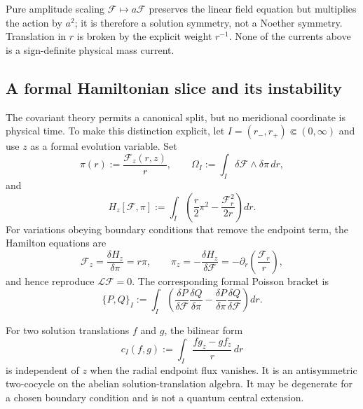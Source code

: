 Pure amplitude scaling $\mathcal F\mapsto a\mathcal F$ preserves the linear
field equation but multiplies the action by $a^2$; it is therefore a solution
symmetry, not a Noether symmetry. Translation in $r$ is broken by the
explicit weight $r^{-1}$. None of the currents above is a sign-definite
physical mass current.

\subsection{A formal Hamiltonian slice and its instability}

The covariant theory permits a canonical split, but no meridional coordinate
is physical time. To make this distinction explicit, let
$I=(r_-,r_+)\Subset(0,\infty)$ and use $z$ as a formal evolution variable.
Set
\begin{equation}
\pi(r):=\frac{\mathcal F_z(r,z)}{r},
\qquad
\Omega_I:=\int_I\delta\mathcal F\wedge\delta\pi\,dr,
\label{eq:ms-slice-symplectic-form}
\end{equation}
and
\begin{equation}
H_z[\mathcal F,\pi]
:=\int_I\left(\frac r2\pi^2-\frac{\mathcal F_r^2}{2r}\right)dr.
\label{eq:ms-z-Hamiltonian}
\end{equation}
For variations obeying boundary conditions that remove the endpoint term,
the Hamilton equations are
\begin{equation}
\mathcal F_z=\frac{\delta H_z}{\delta\pi}=r\pi,
\qquad
\pi_z=-\frac{\delta H_z}{\delta\mathcal F}
=-\partial_r\!\left(\frac{\mathcal F_r}{r}\right),
\label{eq:ms-z-Hamilton-equations}
\end{equation}
and hence reproduce $\mathcal L\mathcal F=0$. The corresponding formal
Poisson bracket is
\begin{equation}
\{P,Q\}_I
:=\int_I\left(
\frac{\delta P}{\delta\mathcal F}\frac{\delta Q}{\delta\pi}
-\frac{\delta P}{\delta\pi}\frac{\delta Q}{\delta\mathcal F}
\right)dr.
\label{eq:ms-slice-Poisson-bracket}
\end{equation}

For two solution translations $f$ and $g$, the bilinear form
\begin{equation}
c_I(f,g)
:=\int_I\frac{f g_z-g f_z}{r}\,dr
\label{eq:ms-solution-cocycle}
\end{equation}
is independent of $z$ when the radial endpoint flux vanishes. It is an
antisymmetric two-cocycle on the abelian solution-translation algebra. It
may be degenerate for a chosen boundary condition and is not a quantum
central extension.

